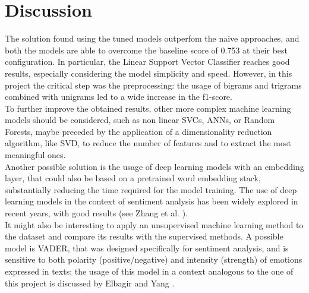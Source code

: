 \documentclass[conference]{IEEEtran}
\begin{document}
\section{Discussion}
The solution found using the tuned models outperfom the naive approaches, and both the models are able to overcome the baseline score of 0.753 at their best configuration. In particular, the Linear Support Vector Classifier reaches good results, especially considering the model simplicity and speed. However, in this project the critical step was the preprocessing: the usage of bigrams and trigrams combined with unigrams led to a wide increase in the f1-score.\\
To further improve the obtained results, other more complex machine learning models should be considered, such as non linear SVCs, ANNs, or Random Forests, maybe preceded by the application of a dimensionality reduction algorithm, like SVD, to reduce the number of features and to extract the most meaningful ones. \\Another possible solution is the usage of deep learning models with an embedding layer, that could also be based on a pretrained word embedding stack, substantially reducing the time required for the model training. The use of deep learning models in the context of sentiment analysis has been widely explored in recent years, with good results (see Zhang et al. \cite{ZhangLeiWangShuaiLiuBing}). \\It might also be interesting to apply an unsupervised machine learning method to the dataset and compare its results with the supervised methods. A possible model is VADER, that was designed specifically for sentiment analysis, and is sensitive to both polarity (positive/negative) and intensity (strength) of emotions expressed in texts; the usage of this model in a context analogous to the one of this project is discussed by Elbagir and Yang \cite{elbagir2019twitter}.



\end{document}
